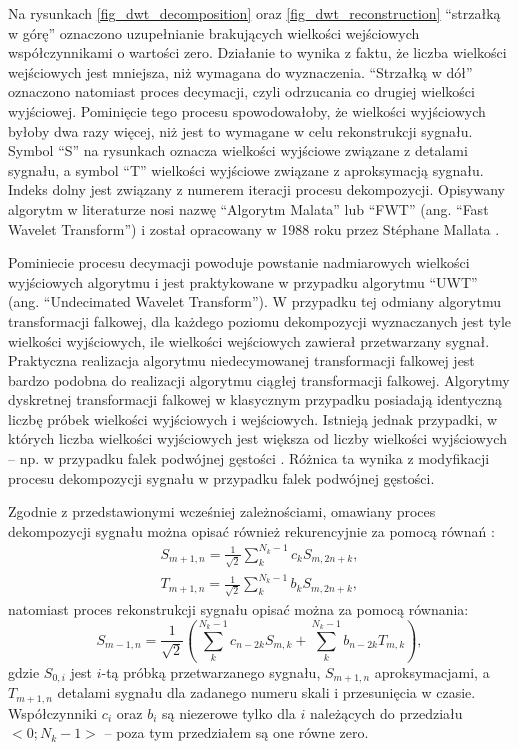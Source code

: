 Na rysunkach \ref{fig_dwt_decomposition} oraz \ref{fig_dwt_reconstruction} \enquote{strzałką w górę} oznaczono uzupełnianie brakujących wielkości wejściowych współczynnikami o wartości zero. Działanie to wynika z faktu, że liczba wielkości wejściowych jest mniejsza, niż wymagana do wyznaczenia. \enquote{Strzałką w dół} oznaczono natomiast proces decymacji, czyli odrzucania co drugiej wielkości wyjściowej. Pominięcie tego procesu spowodowałoby, że wielkości wyjściowych byłoby dwa razy więcej, niż jest to wymagane w celu rekonstrukcji sygnału. Symbol \enquote{S} na rysunkach oznacza wielkości wyjściowe związane z detalami sygnału, a symbol \enquote{T} wielkości wyjściowe związane z aproksymacją sygnału. Indeks dolny jest związany z numerem iteracji procesu dekompozycji. Opisywany algorytm w literaturze nosi nazwę \enquote{Algorytm Malata} lub \enquote{FWT} (ang. \enquote{Fast Wavelet Transform}) i został opracowany w 1988 roku przez Stéphane Mallata \cite{lujian_mallat}.

Pominiecie procesu decymacji powoduje powstanie nadmiarowych wielkości wyjściowych algorytmu i jest praktykowane w przypadku algorytmu \enquote{UWT} (ang. \enquote{Undecimated Wavelet Transform}). W przypadku tej odmiany algorytmu transformacji falkowej, dla każdego poziomu dekompozycji wyznaczanych jest tyle wielkości wyjściowych, ile wielkości wejściowych zawierał przetwarzany sygnał. Praktyczna realizacja algorytmu niedecymowanej transformacji falkowej jest bardzo podobna do realizacji algorytmu ciągłej transformacji falkowej. Algorytmy dyskretnej transformacji falkowej w klasycznym przypadku posiadają identyczną liczbę próbek wielkości wyjściowych i wejściowych. Istnieją jednak przypadki, w których liczba wielkości wyjściowych jest większa od liczby wielkości wyjściowych -- np. w przypadku falek podwójnej gęstości \cite{selenick_ddenusage}. Różnica ta wynika z modyfikacji procesu dekompozycji sygnału w przypadku falek podwójnej gęstości.

Zgodnie z przedstawionymi wcześniej zależnościami, omawiany proces dekompozycji sygnału można opisać również rekurencyjnie za pomocą równań \cite{wallen_handbook}:
\begin{gather}
S_{m+1,n} = \frac{1}{\sqrt{2}} \sum _{k} ^{N_k-1} c_{k} S_{m,2n+k} \label{eqn_dwt_aproxrek}, \\
T_{m+1,n} = \frac{1}{\sqrt{2}} \sum _{k} ^{N_k-1} b_{k} S_{m,2n+k} \label{eqn_dwt_detailrek},
\end{gather}
natomiast proces rekonstrukcji sygnału opisać można za pomocą równania:
\begin{equation}
S_{m-1,n} = \frac{1}{\sqrt{2}} \left( \sum _{k} ^{N_k-1} c_{n-2k} S_{m,k} + \sum _{k} ^{N_k-1} b_{n-2k} T_{m,k} \right) \label{eqn_dwt_reconrek},
\end{equation}
gdzie $S_{0,i}$ jest $i$-tą próbką przetwarzanego sygnału, $S_{m+1,n}$ aproksymacjami, a $T_{m+1,n}$ detalami sygnału dla zadanego numeru skali i przesunięcia w czasie. Współczynniki $c_i$ oraz $b_i$ są niezerowe tylko dla $i$ należących do przedziału $<0;N_k-1>$ -- poza tym przedziałem są one równe zero.

